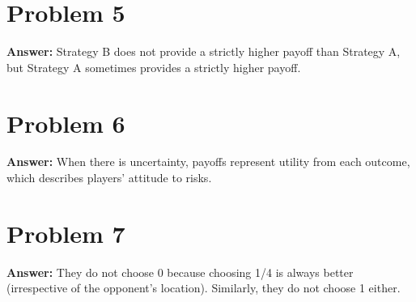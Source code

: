 \documentclass[11pt]{article}
\begin{document}
\section*{Problem 5}
\label{sec:orgeddb093}

\textbf{Answer:} Strategy B does not provide a strictly higher payoff than Strategy A,
but Strategy A sometimes provides a strictly higher payoff.
\section*{Problem 6}
\label{sec:orge1ff703}

\textbf{Answer:} When there is uncertainty, payoffs represent utility from each
outcome, which describes players' attitude to risks.
\section*{Problem 7}
\label{sec:org0c682e0}

\textbf{Answer:} They do not choose 0 because choosing 1/4 is always better
(irrespective of the opponent's location). Similarly, they do not choose 1
either.
\end{document}

